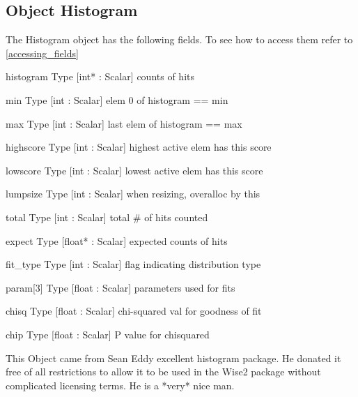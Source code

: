 \subsection{Object Histogram}

\label{object_Histogram}

The Histogram object has the following fields. To see how to access them refer to \ref{accessing_fields}
\begin{description}
\item{histogram} Type [int*   : Scalar]  counts of hits                     

\item{min} Type [int : Scalar]  elem 0 of histogram == min         

\item{max} Type [int : Scalar]  last elem of histogram == max      

\item{highscore} Type [int : Scalar]  highest active elem has this score 

\item{lowscore} Type [int : Scalar]  lowest active elem has this score  

\item{lumpsize} Type [int : Scalar]  when resizing, overalloc by this   

\item{total} Type [int : Scalar]  total # of hits counted            

\item{expect} Type [float* : Scalar]  expected counts of hits            

\item{fit_type} Type [int : Scalar]  flag indicating distribution type  

\item{param[3]} Type [float : Scalar]  parameters used for fits           

\item{chisq} Type [float : Scalar]  chi-squared val for goodness of fit

\item{chip} Type [float : Scalar]  P value for chisquared             

\end{description}
This Object came from Sean Eddy excellent histogram package.
He donated it free of all restrictions to allow it to be used
in the Wise2 package without complicated licensing terms.
He is a *very* nice man.


